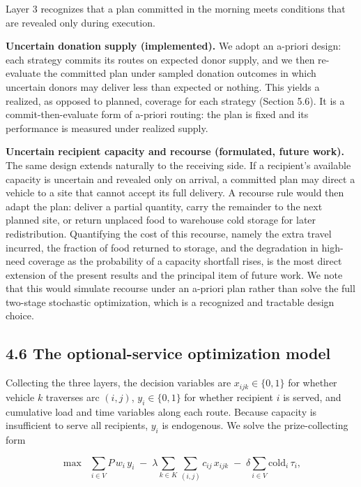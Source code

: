 \documentclass[
  11pt,
]{article}
\begin{document}
Layer 3 recognizes that a plan committed in the morning meets conditions
that are revealed only during execution.

\textbf{Uncertain donation supply (implemented).} We adopt an a-priori
design: each strategy commits its routes on expected donor supply, and
we then re-evaluate the committed plan under sampled donation outcomes
in which uncertain donors may deliver less than expected or nothing.
This yields a realized, as opposed to planned, coverage for each
strategy (Section 5.6). It is a commit-then-evaluate form of a-priori
routing: the plan is fixed and its performance is measured under
realized supply.

\textbf{Uncertain recipient capacity and recourse (formulated, future
work).} The same design extends naturally to the receiving side. If a
recipient's available capacity is uncertain and revealed only on
arrival, a committed plan may direct a vehicle to a site that cannot
accept its full delivery. A recourse rule would then adapt the plan:
deliver a partial quantity, carry the remainder to the next planned
site, or return unplaced food to warehouse cold storage for later
redistribution. Quantifying the cost of this recourse, namely the extra
travel incurred, the fraction of food returned to storage, and the
degradation in high-need coverage as the probability of a capacity
shortfall rises, is the most direct extension of the present results and
the principal item of future work. We note that this would simulate
recourse under an a-priori plan rather than solve the full two-stage
stochastic optimization, which is a recognized and tractable design
choice.

\subsection{4.6 The optional-service optimization
model}\label{the-optional-service-optimization-model}

Collecting the three layers, the decision variables are
\(x_{ijk} \in \{0,1\}\) for whether vehicle \(k\) traverses arc
\((i,j)\), \(y_i \in \{0,1\}\) for whether recipient \(i\) is served,
and cumulative load and time variables along each route. Because
capacity is insufficient to serve all recipients, \(y_i\) is endogenous.
We solve the prize-collecting form

\[ \max \;\; \sum_{i \in V} P\, w_i\, y_i \;-\; \lambda \sum_{k \in K} \sum_{(i,j)} c_{ij}\, x_{ijk} \;-\; \delta \sum_{i \in V} \text{cold}_i\, \tau_i, \]
\end{document}
